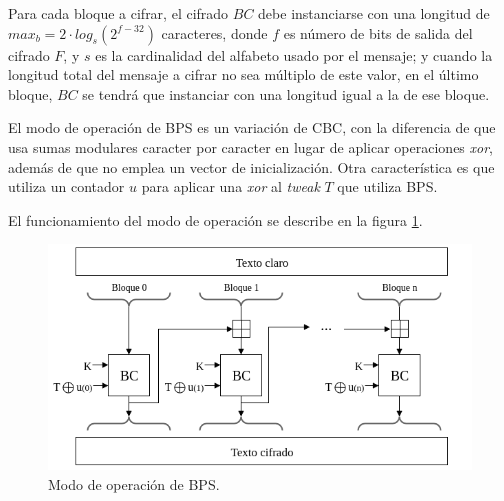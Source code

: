 Para cada bloque a cifrar, el cifrado $BC$ debe instanciarse con una longitud
de $max_b = 2 \cdot log_s(2^{f-32})$ caracteres, donde $f$ es número de bits
de salida del cifrado $F$, y $s$ es la cardinalidad del alfabeto usado por el
mensaje; y cuando la longitud total del mensaje a cifrar no sea múltiplo de
este valor, en el último bloque, $BC$ se tendrá que instanciar con una longitud
igual a la de ese bloque.

El modo de operación de BPS es un variación de CBC, con la diferencia de que
usa sumas modulares caracter por caracter en lugar de aplicar operaciones
\textit{xor}, además de que no emplea un vector de inicialización.
Otra característica es que utiliza un contador $u$ para aplicar una \textit{xor}
al \textit{tweak} $T$ que utiliza BPS.

El funcionamiento del modo de operación se describe en la figura \ref{modo_bps}.

\begin{figure}
  \begin{center}
    \includegraphics[width=0.85\linewidth]
    {../../../diagramas_comunes/bps/modo_de_operacion_bps}
    \caption{Modo de operación de BPS.}
    \label{modo_bps}
   \end{center}
\end{figure}
